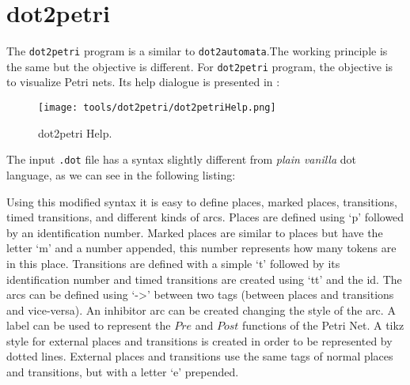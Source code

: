 % 

% 

% 

% 

% 

% 

% 

% 

\section{dot2petri}
\label{sec:dot2petri}

The \verb|dot2petri| program is a similar to \verb|dot2automata|.The 
working principle is the same but the objective is different. For \verb|dot2petri| program, the objective is to
visualize Petri nets. Its help dialogue is presented in :
\begin{figure}[H]
  \centering
  \texttt{[image: tools/dot2petri/dot2petriHelp.png]}
  \caption{dot2petri Help.}
  \label{fig:dot2petriHelp}
\end{figure}

The input \verb|.dot| file has a syntax slightly different from \emph{plain vanilla} dot
language, as we can see in the following listing:



Using this modified syntax it is easy to define places, marked places,
transitions, timed transitions, and different kinds of arcs. Places are defined
using `p' followed by an identification number. Marked places are similar to
places but have the letter `m' and a number appended, this number represents how
many tokens are in this place. Transitions are defined with a simple `t'
followed by its identification number and timed transitions are created using `tt' and the
id. The arcs can be defined using `->' between two tags (between places and
transitions and vice-versa). An inhibitor arc can be created changing the style
of the arc. A label can be used to represent the $Pre$ and $Post$ functions of the
Petri Net. A tikz style for
external places
and transitions is created in order to be represented by dotted lines. External
places and transitions use the same tags of normal places and transitions, but
with a letter `e' prepended.

